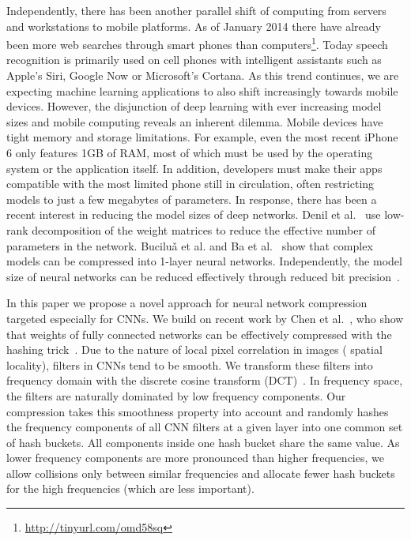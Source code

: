 \documentclass{article} %
\begin{document}
Independently, there has been another parallel shift of computing from servers and workstations to mobile platforms. As of January 2014 there have already been more web searches through smart phones than computers\footnote{\url{http://tinyurl.com/omd58sq}}. Today speech recognition is primarily used on cell phones with intelligent assistants such as Apple's Siri, Google Now or Microsoft's Cortana. As this trend continues,  we are expecting machine learning applications to also shift increasingly towards mobile devices. 
However, the disjunction of deep learning with ever increasing model sizes and mobile computing reveals an inherent dilemma. Mobile devices have tight memory and storage limitations. For example, even the most recent iPhone 6 only features 1GB of RAM, most of which must be used by the operating system or the application itself. In addition, developers must make their apps compatible with the most limited phone still in circulation, often restricting models to just a few megabytes of parameters.
In response, there has been a recent interest in reducing the model sizes of deep networks. Denil et al.~\cite{denil2013predicting} use low-rank decomposition of the weight matrices to reduce the effective number of parameters in the network. Buciluǎ et al. \cite{bucilua2006model} and Ba et al.~\cite{Caruana2014} show that complex models can be compressed into 1-layer neural networks. Independently, the model size of neural networks can be reduced effectively through reduced bit precision~\cite{courbariaux2015low}. 

In this paper we propose a novel approach for neural network compression targeted especially for CNNs. We build on recent work by Chen et al.~\cite{chen2015compressing}, who show that weights of fully connected networks can be effectively compressed with the hashing trick~\cite{weinberger09feature}.
Due to the nature of local pixel correlation in images (\ie{} spatial locality), filters in CNNs tend to be smooth. We transform these filters into frequency domain with the discrete cosine transform (DCT)~\cite{rao2014discrete}. In frequency space, the filters are naturally dominated by low frequency components. Our compression takes this smoothness property into account and randomly hashes the frequency components of all CNN filters at a given layer into one common set of hash buckets. All components inside one hash bucket share the same value. As lower frequency components are more pronounced than higher frequencies, we allow collisions only between similar frequencies and allocate fewer hash buckets for the high frequencies (which are less important). 
\end{document}
